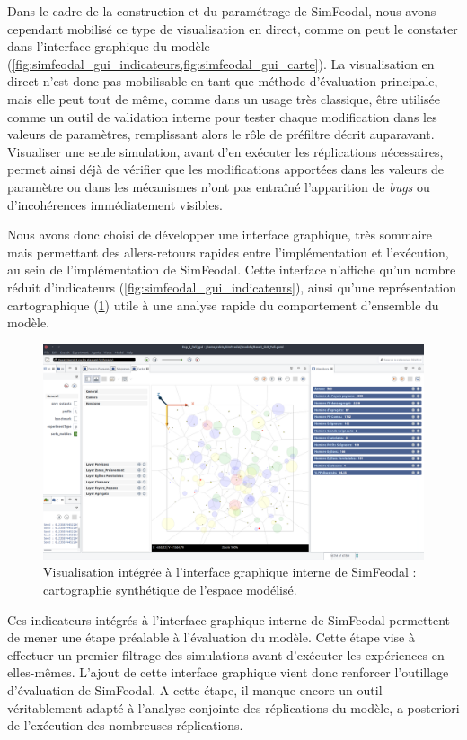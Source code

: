 Dans le cadre de la construction et du paramétrage de SimFeodal, nous avons cependant mobilisé ce type de visualisation en direct, comme on peut le constater dans l'interface graphique du modèle (\cref{fig:simfeodal_gui_indicateurs,fig:simfeodal_gui_carte}).
La visualisation en direct n'est donc pas mobilisable en tant que méthode d'évaluation principale, mais elle peut tout de même, comme dans un usage très classique, être utilisée comme un outil de validation interne pour tester chaque modification dans les valeurs de paramètres, remplissant alors le rôle de \og préfiltre\fg{} décrit auparavant.
Visualiser une seule simulation, avant d'en exécuter les réplications nécessaires, permet ainsi déjà de vérifier que les modifications apportées dans les valeurs de paramètre ou dans les mécanismes n'ont pas entraîné l'apparition de \textit{bugs} ou d'incohérences immédiatement visibles.

Nous avons donc choisi de développer une interface graphique, très sommaire mais permettant des allers-retours rapides entre l'implémentation et l'exécution, au sein de l'implémentation de SimFeodal.
Cette interface n'affiche qu'un nombre réduit d'indicateurs (\cref{fig:simfeodal_gui_indicateurs}), ainsi qu'une représentation cartographique (\cref{fig:simfeodal_gui_carte}) utile à une analyse rapide du comportement d'ensemble du modèle.

\begin{figure}[H]
	\captionsetup{width=\linewidth}
	\includegraphics[width=\linewidth]{img/SimFeodal_GUI_carte.png}
	\caption{Visualisation intégrée à l'interface graphique interne de SimFeodal : cartographie synthétique de l'espace modélisé.}
	\label{fig:simfeodal_gui_carte}
\end{figure}

Ces indicateurs intégrés à l'interface graphique interne de SimFeodal permettent de mener une étape préalable à l'évaluation du modèle.
Cette étape vise à effectuer un premier filtrage des simulations avant d'exécuter les expériences en elles-mêmes.
L'ajout de cette interface graphique vient donc renforcer l'outillage d'évaluation de SimFeodal.
A cette étape, il manque encore un outil véritablement adapté à l'analyse conjointe des réplications du modèle, a posteriori de l'exécution des nombreuses réplications.

